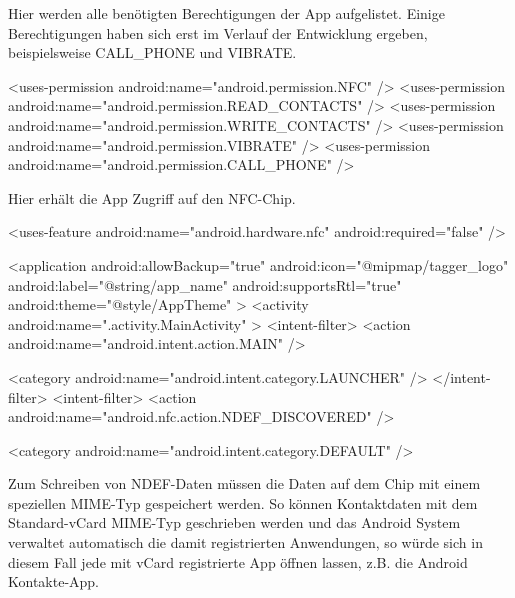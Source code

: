 \documentclass[a4paper,ngerman,12pt]{scrreprt}
\newcommand{\+}{\discretionary{\mbox{\scriptsize$\hookleftarrow$}}{}{}}
\begin{document}
Hier werden alle benötigten Berechtigungen der App aufgelistet. Einige Berechtigungen haben sich erst im Verlauf der Entwicklung ergeben, beispielsweise C\+A\+L\+L\+\_\+\+P\+H\+O\+NE und V\+I\+B\+R\+A\+TE. \begin{DoxyVerb}    <uses-permission android:name="android.permission.NFC" />
    <uses-permission android:name="android.permission.READ_CONTACTS" />
    <uses-permission android:name="android.permission.WRITE_CONTACTS" />
    <uses-permission android:name="android.permission.VIBRATE" />
    <uses-permission android:name="android.permission.CALL_PHONE" />
\end{DoxyVerb}


Hier erhält die App Zugriff auf den N\+F\+C-\/\+Chip. \begin{DoxyVerb}    <uses-feature
        android:name="android.hardware.nfc"
        android:required="false" />

    <application
        android:allowBackup="true"
        android:icon="@mipmap/tagger_logo"
        android:label="@string/app_name"
        android:supportsRtl="true"
        android:theme="@style/AppTheme" >
        <activity android:name=".activity.MainActivity" >
            <intent-filter>
                <action android:name="android.intent.action.MAIN" />

                <category android:name="android.intent.category.LAUNCHER" />
            </intent-filter>
            <intent-filter>
                <action android:name="android.nfc.action.NDEF_DISCOVERED" />

                <category android:name="android.intent.category.DEFAULT" />
\end{DoxyVerb}


Zum Schreiben von N\+D\+E\+F-\/\+Daten müssen die Daten auf dem Chip mit einem speziellen M\+I\+M\+E-\/\+Typ gespeichert werden. So können Kontaktdaten mit dem Standard-\/v\+Card M\+I\+M\+E-\/\+Typ geschrieben werden und das Android System verwaltet automatisch die damit registrierten Anwendungen, so würde sich in diesem Fall jede mit v\+Card registrierte App öffnen lassen, z.\+B. die Android Kontakte-\/\+App.
\end{document}

